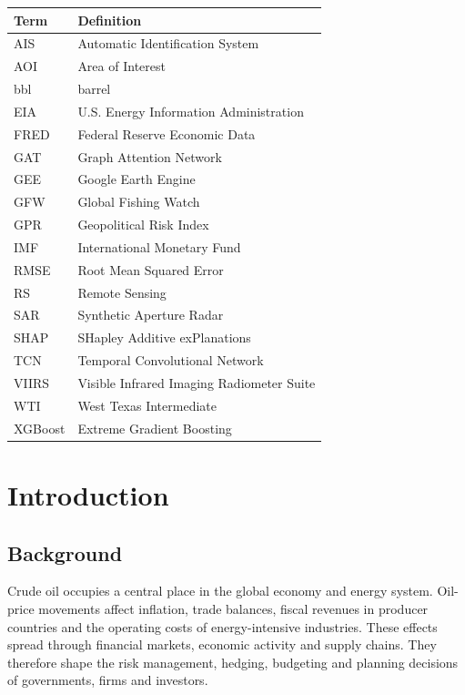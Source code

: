 \documentclass[
  british,
  12pt,
  oneside]{book}
\newcounter{none} %
\begin{document}
{\def\LTcaptype{none} %
\begin{longtable}[]{@{}ll@{}}
\toprule\noalign{}
Term & Definition \\
\midrule\noalign{}
\endhead
\bottomrule\noalign{}
\endlastfoot
AIS & Automatic Identification System \\
AOI & Area of Interest \\
bbl & barrel \\
EIA & U.S. Energy Information Administration \\
FRED & Federal Reserve Economic Data \\
GAT & Graph Attention Network \\
GEE & Google Earth Engine \\
GFW & Global Fishing Watch \\
GPR & Geopolitical Risk Index \\
IMF & International Monetary Fund \\
RMSE & Root Mean Squared Error \\
RS & Remote Sensing \\
SAR & Synthetic Aperture Radar \\
SHAP & SHapley Additive exPlanations \\
TCN & Temporal Convolutional Network \\
VIIRS & Visible Infrared Imaging Radiometer Suite \\
WTI & West Texas Intermediate \\
XGBoost & Extreme Gradient Boosting \\
\end{longtable}
}

\chapter{Introduction}\label{intro}

\section{Background}\label{intro-background}

Crude oil occupies a central place in the global economy and energy system. Oil-price movements affect inflation, trade balances, fiscal revenues in producer countries and the operating costs of energy-intensive industries. These effects spread through financial markets, economic activity and supply chains. They therefore shape the risk management, hedging, budgeting and planning decisions of governments, firms and investors.
\end{document}
